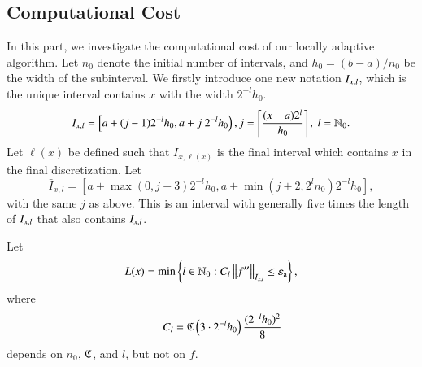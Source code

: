 \subsection{Computational Cost}

In this part, we investigate the computational cost of our locally adaptive algorithm. Let $n_0$ denote the initial number of intervals, and
 $h_0=(b-a)/{n_0}$ be the width of the subinterval. We firstly introduce one new notation $\Ixl$, which is the unique interval contains $x$ with
 the width $2^{-l}h_0$.
\[\Ixl=\left[a+(j-1)2^{-l}h_0,a+j \ 2^{-l}h_0\right), j=\left\lceil\frac{(x-a)2^l}{h_0}\right\rceil, \ l = \mathbb{N}_0.\]
Let
$\ell(x)$ be defined such that
$I_{x,\ell(x)}$ is the final interval which contains $x$ in the final discretization.
Let
\[\bar{I}_{x,l}=\left[a+\max(0,j-3)2^{-l}h_0, a+ \min(j+2,2^ln_0)2^{-l}h_0\right],
\] with the same $j$ as above. This is an interval with generally five times the length of $\Ixl$ that also contains $\Ixl$.

Let
\begin{equation}\label{eqn:defoflx}
L(x) = \min \left\{ l \in \natzero : C_l  \norm[\bar{I}_{x,l}]{f''} \le \abstol \right\},
\end{equation}
where
\[\qquad C_l=\fC\left(3\cdot2^{-l}h_0\right)\frac{(2^{-l}h_0)^2}{8}
\]
depends on $n_0$, $\fC$, and $l$, but not on $f$.


